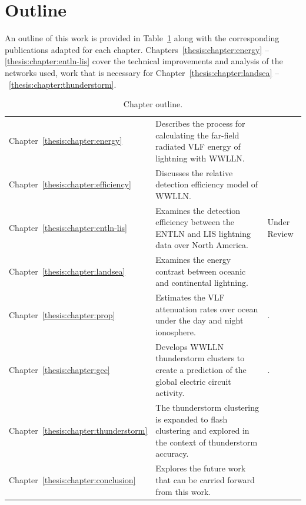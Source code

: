 \section{Outline}

An outline of this work is provided in Table~\ref{intro:table:outline} along with the corresponding publications adapted for each chapter.
Chapters~\ref{thesis:chapter:energy} -- \ref{thesis:chapter:entln-lis} cover the technical improvements and analysis of the networks used, work that is necessary for Chapter~\ref{thesis:chapter:landsea} --~\ref{thesis:chapter:thunderstorm}.

\begin{table}[ht!]
\caption{Chapter outline.}
\label{intro:table:outline}
\begin{center}
\begin{tabular}{l p{4in} l}

\rule{0pt}{3ex}
Chapter~\ref{thesis:chapter:energy}	&
Describes the process for calculating the far-field radiated VLF energy of lightning with WWLLN.	&
\citet{Hutchins2012}\\ 

\rule{0pt}{3ex}
Chapter~\ref{thesis:chapter:efficiency}	&
Discusses the relative detection efficiency model of WWLLN.	&
\citet{Hutchins2012a}\\ 

\rule{0pt}{3ex}
Chapter~\ref{thesis:chapter:entln-lis}	&
Examines the detection efficiency between the ENTLN and LIS lightning data over North America.	&
Under Review\\ 

\rule{0pt}{3ex}
Chapter~\ref{thesis:chapter:landsea}	&
Examines the energy contrast between oceanic and continental lightning.	&
\citet{Hutchins2013}\\ 

\rule{0pt}{3ex}
Chapter~\ref{thesis:chapter:prop} &
Estimates the VLF attenuation rates over ocean under the day and night ionosphere.
& \citet{Hutchins2013a}.\\

\rule{0pt}{3ex}
Chapter~\ref{thesis:chapter:gec} &
Develops WWLLN thunderstorm clusters to create a prediction of the global electric circuit activity.
& \citet{Hutchins2014}.\\

\rule{0pt}{3ex}
Chapter~\ref{thesis:chapter:thunderstorm}&
The thunderstorm clustering is expanded to flash clustering and explored in the context of thunderstorm accuracy. &
\\

\rule{0pt}{3ex}
Chapter~\ref{thesis:chapter:conclusion} &
Explores the future work that can be carried forward from this work. &
\\

\end{tabular}
\end{center}
\end{table}
